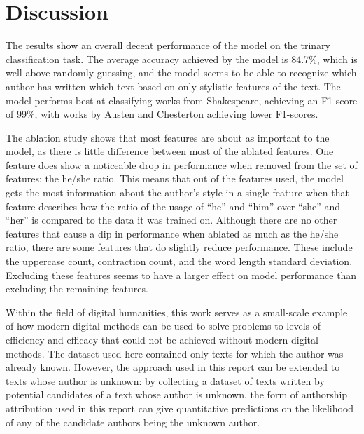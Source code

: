 \documentclass{article}
\begin{document}
\section{Discussion}
The results show an overall decent performance of the model on the trinary classification task.
The average accuracy achieved by the model is 84.7\%, which is well above randomly guessing, and the model seems to be able to recognize which author has written which text based on only stylistic features of the text.
The model performs best at classifying works from Shakespeare, achieving an F1-score of 99\%, with works by Austen and Chesterton achieving lower F1-scores.

The ablation study shows that most features are about as important to the model, as there is little difference between most of the ablated features.
One feature does show a noticeable drop in performance when removed from the set of features: the he/she ratio.
This means that out of the features used, the model gets the most information about the author's style in a single feature when that feature describes how the ratio of the usage of ``he'' and ``him'' over ``she'' and ``her'' is compared to the data it was trained on.
Although there are no other features that cause a dip in performance when ablated as much as the he/she ratio, there are some features that do slightly reduce performance.
These include the uppercase count, contraction count, and the word length standard deviation.
Excluding these features seems to have a larger effect on model performance than excluding the remaining features.

Within the field of digital humanities, this work serves as a small-scale example of how modern digital methods can be used to solve problems to levels of efficiency and efficacy that could not be achieved without modern digital methods.
The dataset used here contained only texts for which the author was already known.
However, the approach used in this report can be extended to texts whose author is unknown: by collecting a dataset of texts written by potential candidates of a text whose author is unknown, the form of authorship attribution used in this report can give quantitative predictions on the likelihood of any of the candidate authors being the unknown author.
\end{document}
